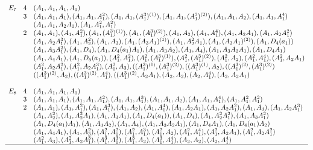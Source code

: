 \documentclass[twoside,a4paper,reqno,11pt]{amsart}
\newcommand{\<}{\langle}
\renewcommand{\>}{\rangle}
\renewcommand{\:}{\colon}
\theoremstyle{plain}
\theoremstyle{definition}
\begin{document}
{\begin{table}[h]
\[\begin{array}{lll}
& & \\
E_7 & 4 & (A_1, A_1, A_1, A_1) \\ 
& 3 & (A_1,A_1,A_1), (A_1,A_1,A_1^2), (A_1,A_1,(A_1^3)^{(1)}), (A_1,A_1,(A_1^3)^{(2)}), (A_1,A_1,A_2), (A_1,A_1,A_1^4) \\
& &  (A_1,A_1,A_2A_1), (A_1,A_1^2,A_1^2) \\
& 2 & (A_1,A_1), (A_1,A_1^2), (A_1,(A_1^3)^{(1)}), (A_1,(A_1^3)^{(2)}), (A_1,A_2), (A_1,A_1^4), (A_1,A_2A_1), (A_1,A_2A_1^2) \\
& &  (A_1,A_2A_1^3), (A_1,A_2^2), (A_1,A_3), (A_1,(A_3A_1)^{(1)}), (A_1,A_2^2A_1), (A_1,(A_3A_1)^{(2)}), (A_1,D_4(a_1)) \\
& &  (A_1,A_3A_1^2), (A_1,D_4), (A_1,D_4(a_1)A_1), (A_1,A_3A_2), (A_1,A_4), (A_1,A_3A_2A_1), (A_1,D_4A_1) \\
& &  (A_1,A_4A_1), (A_1,D_5(a_1)), 
(A_1^2,A_1^2), (A_1^2,(A_1^3)^{(1)}), (A_1^2,(A_1^3)^{(2)}), (A_1^2,A_2), (A_1^2,A_1^4), (A_1^2,A_2A_1) \\
& & (A_1^2,A_2A_1^2), (A_1^2,A_2A_1^3),  
(A_1^2,A_3), ((A_1^3)^{(1)},(A_1^3)^{(2)}), ((A_1^3)^{(1)},A_2), ((A_1^3)^{(2)}, (A_1^3)^{(2)}) \\
& & ((A_1^3)^{(2)},A_2), ((A_1^3)^{(2)},A_1^4), ((A_1^3)^{(2)},A_2A_1), (A_2,A_2), (A_2, A_1^4), (A_2, A_2A_1) \\
& & \\
E_8 & 4 & (A_1, A_1, A_1, A_1) \\
& 3 & (A_1,A_1, A_1), (A_1,A_1,A_1^2), (A_1,A_1,A_1^3), (A_1,A_1,A_2), (A_1,A_1,A_1^4), (A_1,A_1^2,A_1^2) \\
& 2 & (A_1,A_1), (A_1,A_1^2), (A_1,A_1^3), (A_1,A_2), (A_1,A_1^4), (A_1,A_2A_1), (A_1,A_2A_1^2), (A_1,A_3), (A_1,A_2A_1^3) \\
& &  (A_1,A_2^2), (A_1,A_2^2A_1), (A_1,A_3A_1), (A_1,D_4(a_1)), (A_1,D_4), (A_1,A_2^2A_1^2), (A_1,A_3A_1^2) \\
& & (A_1, D_4(a_1)A_1), (A_1,A_3A_2), (A_1,A_4), (A_1,A_3A_2A_1), (A_1,D_4A_1),(A_1,D_4(a_1)A_2)  \\
& &  (A_1,A_4A_1), (A_1,A_3^2), (A_1^2, A_1^2), (A_1^2,A_1^3), (A_1^2,A_2), (A_1^2,A_1^4), (A_1^2,A_2A_1), (A_1^2,A_2A_1^2) \\
& & (A_1^2,A_3), (A_1^2,A_2A_1^3), (A_1^3, A_1^3), (A_1^3,A_2), (A_1^3,A_1^4), (A_2, A_2), (A_2,A_1^4) \\ \hline
\end{array}
\]
\caption{The varieties $X = \mathcal{C}_1 \times \cdots \times \mathcal{C}_t$ in Theorem \ref{t:main} with 
$\Delta = \emptyset$, Part I}
\label{tab:main}
\end{table}
}
\end{document}
